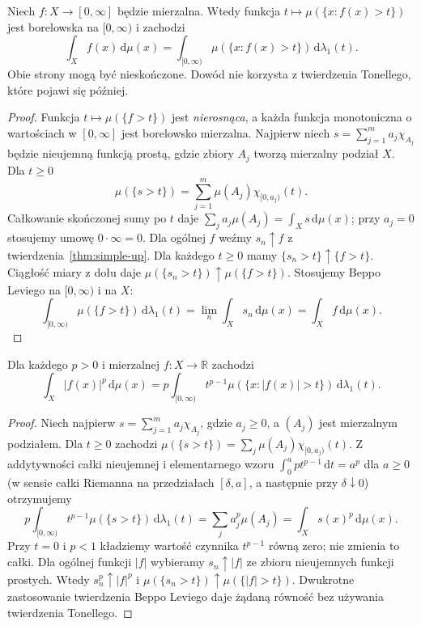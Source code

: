 \begin{twierdzenie}
\label{thm:layer-cake-8}
Niech $f:X\to[0,\infty]$ będzie mierzalna.
Wtedy funkcja $t\mapsto\mu(\{x:f(x)>t\})$
jest borelowska na $[0,\infty)$ i zachodzi
\begin{equation}\label{eq:layer-cake-8}
\int_Xf(x)\,\mathrm d\mu(x)
=\int_{[0,\infty)}\mu(\{x:f(x)>t\})\,
\mathrm d\lambda_1(t).
\end{equation}
Obie strony mogą być nieskończone. Dowód nie korzysta
z twierdzenia Tonellego, które pojawi się później.
\end{twierdzenie}
\begin{proof}
Funkcja $t\mapsto\mu(\{f>t\})$ jest \emph{nierosnąca},
a każda funkcja monotoniczna
o wartościach w $[0,\infty]$ jest borelowsko mierzalna.
Najpierw niech $s=\sum_{j=1}^m a_j\chi_{A_j}$
będzie nieujemną funkcją prostą, gdzie zbiory $A_j$
tworzą mierzalny podział $X$. Dla $t\ge0$
\[
\mu(\{s>t\})=\sum_{j=1}^m
\mu(A_j)\chi_{[0,a_j)}(t).
\]
Całkowanie skończonej sumy po $t$ daje
$\sum_ja_j\mu(A_j)=\int_Xs\,\mathrm d\mu(x)$;
przy $a_j=0$ stosujemy umowę $0\cdot\infty=0$.
Dla ogólnej $f$ weźmy $s_n\uparrow f$ z
twierdzenia~\ref{thm:simple-up}. Dla każdego $t\ge0$
mamy $\{s_n>t\}\uparrow\{f>t\}$. Ciągłość miary
z dołu daje
$\mu(\{s_n>t\})\uparrow\mu(\{f>t\})$.
Stosujemy Beppo Leviego na $[0,\infty)$ i na $X$:
\[
\int_{[0,\infty)}\mu(\{f>t\})\,
\mathrm d\lambda_1(t)
=\lim_n\int_Xs_n\,\mathrm d\mu(x)
=\int_Xf\,\mathrm d\mu(x).
\]
\end{proof}

\begin{wniosek}\label{idx:08:wniosek:20}

Dla każdego $p>0$ i mierzalnej $f:X\to\mathbb R$
zachodzi
\[
\int_X|f(x)|^p\,\mathrm d\mu(x)
=p\int_{[0,\infty)}t^{p-1}
\mu(\{x:|f(x)|>t\})\,\mathrm d\lambda_1(t).
\]
\end{wniosek}
\begin{proof}
Niech najpierw $s=\sum_{j=1}^m a_j\chi_{A_j}$,
gdzie $a_j\ge0$, a $(A_j)$ jest mierzalnym podziałem.
Dla $t\ge0$ zachodzi
$\mu(\{s>t\})=\sum_j\mu(A_j)\chi_{[0,a_j)}(t)$.
Z addytywności całki nieujemnej i elementarnego wzoru
$\int_0^{a}pt^{p-1}\,\mathrm dt=a^p$ dla $a\ge0$
(w sensie całki Riemanna na przedziałach
$[\delta,a]$, a następnie przy $\delta\downarrow0$)
otrzymujemy
\[
p\int_{[0,\infty)}t^{p-1}\mu(\{s>t\})\,
\mathrm d\lambda_1(t)=\sum_j a_j^p\mu(A_j)
=\int_Xs(x)^p\,\mathrm d\mu(x).
\]
Przy $t=0$ i $p<1$ kładziemy wartość czynnika
$t^{p-1}$ równą zero; nie zmienia to całki.
Dla ogólnej funkcji $|f|$ wybieramy $s_n\uparrow|f|$
ze zbioru nieujemnych funkcji prostych.
Wtedy $s_n^p\uparrow|f|^p$ i
$\mu(\{s_n>t\})\uparrow\mu(\{|f|>t\})$.
Dwukrotne zastosowanie twierdzenia Beppo Leviego
daje żądaną równość bez używania twierdzenia Tonellego.
\end{proof}

